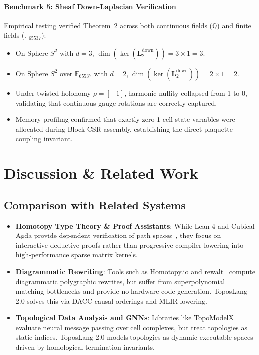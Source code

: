 \documentclass[conference]{IEEEtran}
\begin{document}
\paragraph{Benchmark 5: Sheaf Down-Laplacian Verification}
Empirical testing verified Theorem~2 across both continuous fields ($\mathbb{Q}$) and finite fields ($\mathbb{F}_{65537}$):
\begin{itemize}
    \item On Sphere $S^2$ with $d=3$, $\dim(\ker(\mathbf{L}_2^{\text{down}})) = 3 \times 1 = 3$.
    \item On Sphere $S^2$ over $\mathbb{F}_{65537}$ with $d=2$, $\dim(\ker(\mathbf{L}_2^{\text{down}})) = 2 \times 1 = 2$.
    \item Under twisted holonomy $\rho = [-1]$, harmonic nullity collapsed from 1 to 0, validating that continuous gauge rotations are correctly captured.
    \item Memory profiling confirmed that exactly zero 1-cell state variables were allocated during Block-CSR assembly, establishing the direct plaquette coupling invariant.
\end{itemize}

\section{Discussion \& Related Work}

\subsection{Comparison with Related Systems}
\begin{itemize}
    \item \textbf{Homotopy Type Theory \& Proof Assistants}: While Lean 4 and Cubical Agda provide dependent verification of path spaces~\cite{voevodsky2013homotopy}, they focus on interactive deductive proofs rather than progressive compiler lowering into high-performance sparse matrix kernels.
    \item \textbf{Diagrammatic Rewriting}: Tools such as Homotopy.io and rewalt~\cite{kissinger2019homotopy} compute diagrammatic polygraphic rewrites, but suffer from superpolynomial matching bottlenecks and provide no hardware code generation. ToposLang 2.0 solves this via DACC causal orderings and MLIR lowering.
    \item \textbf{Topological Data Analysis and GNNs}: Libraries like TopoModelX~\cite{topomodelx2023} evaluate neural message passing over cell complexes, but treat topologies as static indices. ToposLang 2.0 models topologies as dynamic executable spaces driven by homological termination invariants.
\end{itemize}
\end{document}
